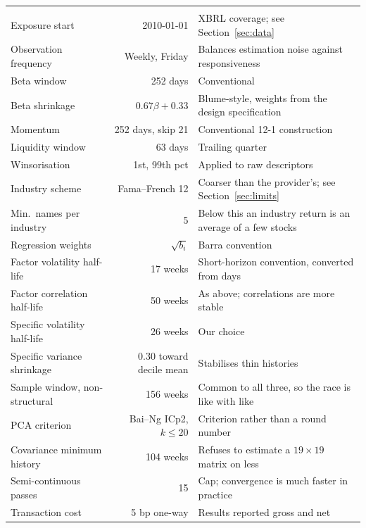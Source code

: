 \begin{table}[tbp]
\begin{tabularx}{\textwidth}{@{}lrY@{}}
\addlinespace
{}\\
Exposure start & 2010-01-01 & XBRL coverage; see
Section~\ref{sec:data}\\
Observation frequency & Weekly, Friday & Balances estimation noise against
responsiveness\\
Beta window & 252 days & Conventional\\
Beta shrinkage & $0.67\beta+0.33$ & Blume-style, weights from the design
specification\\
Momentum & 252 days, skip 21 & Conventional 12-1 construction\\
Liquidity window & 63 days & Trailing quarter\\
Winsorisation & 1st, 99th pct & Applied to raw descriptors\\
Industry scheme & Fama--French 12 & Coarser than the provider's; see
Section~\ref{sec:limits}\\
Min.\ names per industry & 5 & Below this an industry return is an average of
a few stocks\\
Regression weights & $\sqrt{b_i}$ & Barra convention\\
Factor volatility half-life & 17 weeks & Short-horizon convention, converted
from days\\
Factor correlation half-life & 50 weeks & As above; correlations are more
stable\\
Specific volatility half-life & 26 weeks & Our choice\\
Specific variance shrinkage & 0.30 toward decile mean & Stabilises thin
histories\\
Sample window, non-structural & 156 weeks & Common to all three, so the race
is like with like\\
PCA criterion & Bai--Ng ICp2, $k\le20$ & Criterion rather than a round
number\\
Covariance minimum history & 104 weeks & Refuses to estimate a $19\times19$
matrix on less\\
Semi-continuous passes & 15 & Cap; convergence is much faster in practice\\
Transaction cost & 5 bp one-way & Results reported gross and net\\
\bottomrule
\end{tabularx}
\end{table}
